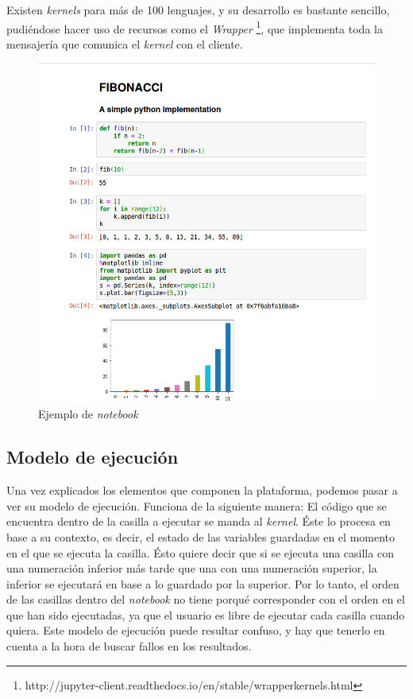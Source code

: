 \documentclass[11pt,spanish,listoffigures]{tfgetsinf}
\begin{document}
Existen \textit{kernels} para más de 100 lenguajes, y su desarrollo es bastante sencillo, pudiéndose hacer uso de recursos como el \textit{Wrapper} \footnote{http://jupyter-client.readthedocs.io/en/stable/wrapperkernels.html}, que implementa toda la mensajería que comunica el \textit{kernel} con el cliente.

\begin{figure}[H]
	\centering
  	\includegraphics[width=\linewidth]{notebook.png}
  	\caption{Ejemplo de \textit{notebook}}
  	\label{fig:notebook}
\end{figure}


\subsection{Modelo de ejecución}
\label{subsec:modelo-ejec}

Una vez explicados los elementos que componen la plataforma, podemos pasar a ver su modelo de ejecución. Funciona de la siguiente manera: El código que se encuentra dentro de la casilla a ejecutar se manda al \textit{kernel}. Éste lo procesa en base a su contexto, es decir, el estado de las variables guardadas en el momento en el que se ejecuta la casilla. Ésto quiere decir que si se ejecuta una casilla con una numeración inferior más tarde que una con una numeración superior, la inferior se ejecutará en base a lo guardado por la superior. Por lo tanto, el orden de las casillas dentro del \textit{notebook} no tiene porqué corresponder con el orden en el que han sido ejecutadas, ya que el usuario es libre de ejecutar cada casilla cuando quiera. Este modelo de ejecución puede resultar confuso, y hay que tenerlo en cuenta a la hora de buscar fallos en los resultados.
\end{document}
